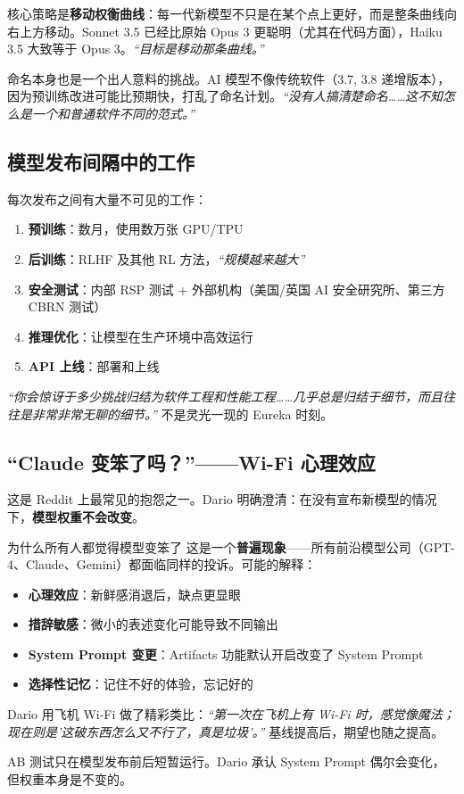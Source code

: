 \documentclass[a4paper]{article}
\begin{document}
核心策略是\textbf{移动权衡曲线}：每一代新模型不只是在某个点上更好，而是整条曲线向右上方移动。Sonnet 3.5 已经比原始 Opus 3 更聪明（尤其在代码方面），Haiku 3.5 大致等于 Opus 3。\textit{``目标是移动那条曲线。''}

命名本身也是一个出人意料的挑战。AI 模型不像传统软件（3.7, 3.8 递增版本），因为预训练改进可能比预期快，打乱了命名计划。\textit{``没有人搞清楚命名……这不知怎么是一个和普通软件不同的范式。''}

\subsection{模型发布间隔中的工作}

每次发布之间有大量不可见的工作：

\begin{enumerate}
    \item \textbf{预训练}：数月，使用数万张 GPU/TPU
    \item \textbf{后训练}：RLHF 及其他 RL 方法，\textit{``规模越来越大''}
    \item \textbf{安全测试}：内部 RSP 测试 + 外部机构（美国/英国 AI 安全研究所、第三方 CBRN 测试）
    \item \textbf{推理优化}：让模型在生产环境中高效运行
    \item \textbf{API 上线}：部署和上线
\end{enumerate}

\textit{``你会惊讶于多少挑战归结为软件工程和性能工程……几乎总是归结于细节，而且往往是非常非常无聊的细节。''} 不是灵光一现的 Eureka 时刻。

\subsection{``Claude 变笨了吗？''——Wi-Fi 心理效应}

这是 Reddit 上最常见的抱怨之一。Dario 明确澄清：在没有宣布新模型的情况下，\textbf{模型权重不会改变}。

\begin{warningbox}{为什么所有人都觉得模型变笨了}
这是一个\textbf{普遍现象}——所有前沿模型公司（GPT-4、Claude、Gemini）都面临同样的投诉。可能的解释：

\begin{itemize}
    \item \textbf{心理效应}：新鲜感消退后，缺点更显眼
    \item \textbf{措辞敏感}：微小的表述变化可能导致不同输出
    \item \textbf{System Prompt 变更}：Artifacts 功能默认开启改变了 System Prompt
    \item \textbf{选择性记忆}：记住不好的体验，忘记好的
\end{itemize}

Dario 用飞机 Wi-Fi 做了精彩类比：\textit{``第一次在飞机上有 Wi-Fi 时，感觉像魔法；现在则是'这破东西怎么又不行了，真是垃圾'。''} 基线提高后，期望也随之提高。

AB 测试只在模型发布前后短暂运行。Dario 承认 System Prompt 偶尔会变化，但权重本身是不变的。
\end{warningbox}
\end{document}
